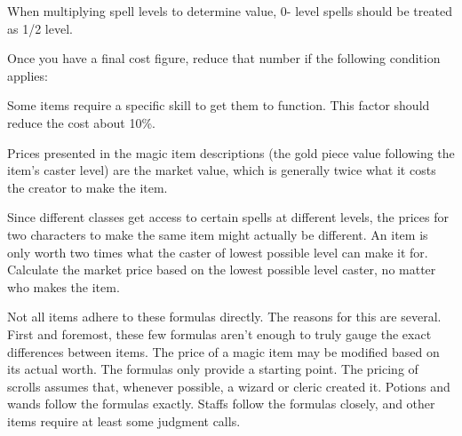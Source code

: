  When multiplying spell levels to determine value, 0- level spells should be treated as 1/2 level.

 Once you have a final cost figure, reduce that number if the following condition applies:
\begin{itemize}
 Some items require a specific skill to get them to function. This factor should reduce the cost about 10\%.
\end{itemize}

Prices presented in the magic item descriptions (the gold piece value following the item's caster level) are the market value, which is generally twice what it costs the creator to make the item.

Since different classes get access to certain spells at different levels, the prices for two characters to make the same item might actually be different. An item is only worth two times what the caster of lowest possible level can make it for. Calculate the market price based on the lowest possible level caster, no matter who makes the item.

Not all items adhere to these formulas directly. The reasons for this are several. First and foremost, these few formulas aren't enough to truly gauge the exact differences between items. The price of a magic item may be modified based on its actual worth. The formulas only provide a starting point. The pricing of scrolls assumes that, whenever possible, a wizard or cleric created it. Potions and wands follow the formulas exactly. Staffs follow the formulas closely, and other items require at least some judgment calls.

